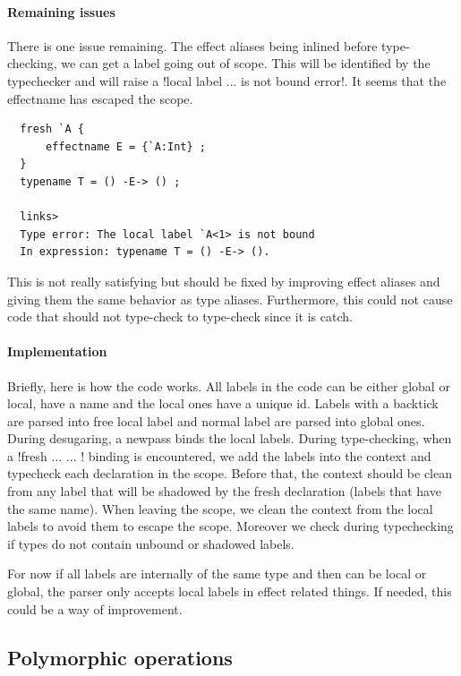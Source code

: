 \documentclass[10pt, nonacm=true, language=french, language=english]{acmart}
\begin{document}
\paragraph{Remaining issues}
There is one issue remaining. The effect aliases being inlined before type-checking, we can get a label going out of scope. This will be identified by the typechecker and will raise a !local label ... is not bound error!. It seems that the effectname has escaped the scope.
\begin{lstlisting}
  fresh `A {
      effectname E = {`A:Int} ;
  }
  typename T = () -E-> () ;

  links>
  Type error: The local label `A<1> is not bound
  In expression: typename T = () -E-> ().
\end{lstlisting}
This is not really satisfying but should be fixed by improving effect aliases and giving them the same behavior as type aliases. Furthermore, this could not cause code that should not type-check to type-check since it is catch.

\paragraph{Implementation}
Briefly, here is how the code works. All labels in the code can be either global or local, have a name and the local ones have a unique id. Labels with a backtick are parsed into free local label and normal label are parsed into global ones. During desugaring, a newpass binds the local labels. During type-checking, when a !fresh ... { ... }! binding is encountered, we add the labels into the context and typecheck each declaration in the scope. Before that, the context should be clean from any label that will be shadowed by the fresh declaration (labels that have the same name). When leaving the scope, we clean the context from the local labels to avoid them to escape the scope. Moreover we check during typechecking if types do not contain unbound or shadowed labels.

\begin{rem}
  For now if all labels are internally of the same type and then can be local or global, the parser only accepts local labels in effect related things. If needed, this could be a way of improvement.
\end{rem}


\subsection{Polymorphic operations}
\label{sec:poly-op}
\end{document}
